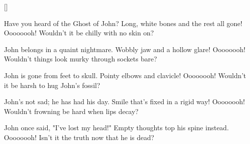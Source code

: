 []

\beginverse
Have you heard of the Ghost of John?
Long, white bones and the rest all gone!
Oooooooh!
Wouldn't it be chilly with no skin on?
\endverse

\beginverse
John belongs in a quaint nightmare.
Wobbly jaw and a hollow glare!
Oooooooh!
Wouldn't things look murky through sockets bare?
\endverse

\beginverse
John is gone from feet to skull.
Pointy elbows and clavicle!
Oooooooh!
Wouldn't it be harsh to hug John's fossil?
\endverse

\beginverse
John's not sad; he has had his day.
Smile that's fixed in a rigid way!
Oooooooh!
Wouldn't frowning be hard when lips decay?
\endverse

\beginverse
John once said, "I've lost my head!"
Empty thoughts top his spine instead.
Oooooooh!
Isn't it the truth now that he is dead?
\endverse


\endsong